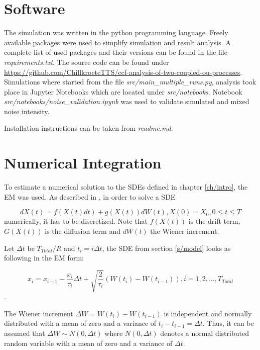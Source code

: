 \documentclass[a4paper,12pt,oneside]{book}
\theoremstyle{break}
\begin{document}
\section{Software}
The simulation was written in the python programming language. Freely available packages were used to simplify simulation and result analysis. A complete list of used packages and their versions can be found in the file \emph{requirements.txt}. The source code can be found under \hyperlink{https://github.com/ChillkroeteTTS/ccf-analysis-of-two-coupled-ou-processes}{https://github.com/ChillkroeteTTS/ccf-analysis-of-two-coupled-ou-processes}.
Simulations where started from the file \emph{src/main\_multiple\_runs.py}, analysis took place in Jupyter Notebooks which are located under \emph{src/notebooks}. Notebook \emph{src/notebooks/noise\_validation.ipynb} was used to validate simulated and mixed noise intensity.

Installation instructions can be taken from \emph{readme.md}.

\section{Numerical Integration}\label{s/meth/num}
To estimate a numerical solution to the \ac{SDE}s defined in chapter \ref{ch/intro}, the \ac{EM} was used.
As described in \cite{numSim}, in order to solve a \ac{SDE}

\begin{equation}\label{eq/meth/num/sde}
	dX(t) = f(X(t)dt) + g(X(t))dW(t), X(0)=X_0, 0 \le t \le T
\end{equation} numerically, it has to be discretized.
Note that $f(X(t))$ is the drift term, $G(X(t))$ is the diffusion term and $dW(t)$ the  Wiener increment.

Let $\Delta t$ be $T_{Total}/R$ and $t_i = i\Delta t$, the \ac{SDE} from section \ref{s/model} looks as following in the \ac{EM} form:


\begin{equation}\label{eq/meth/num/discSde}
	x_i = x_{i-1} -\frac{x_i}{\tau_i} \Delta t + \sqrt{\frac{2}{\tau_i}} (W(t_i)  - W(t_{i-1})), i=1,2,..., T_{Total}
\end{equation}.

The Wiener increment $\Delta W = W(t_i)  - W(t_{i-1})$ is independent and normally distributed with a mean of zero and a variance of $t_i - t_{i-1} = \Delta t$. Thus, it can be assumed that $\Delta W \sim N(0, \Delta t)$ where $N(0, \Delta t)$ denotes a normal distributed random variable with a mean  of zero and a variance of $\Delta t$. 
\end{document}
